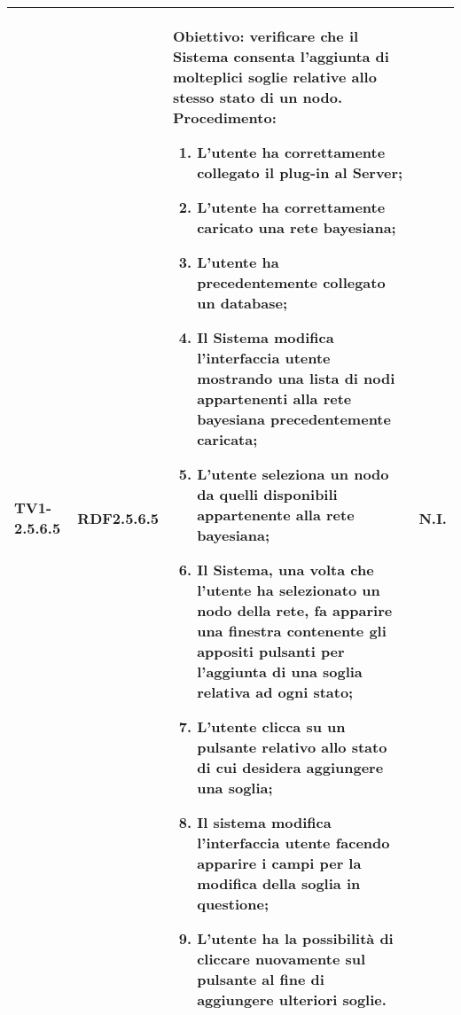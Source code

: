 \begin{longtable}{|C{.15\textwidth}|C{.13\textwidth}|m{.52\textwidth}|C{.08\textwidth}|}
TV1-2.5.6.5 & RDF2.5.6.5  &
	\textbf{Obiettivo}: verificare che il Sistema consenta l'aggiunta di molteplici soglie relative allo stesso stato di un nodo. \newline
	\textbf{Procedimento}:
	\begin{enumerate}
		\item L'utente ha correttamente collegato il plug-in al Server;
		\item L'utente ha correttamente caricato una rete bayesiana;
		\item L'utente ha precedentemente collegato un database;
		\item Il Sistema modifica l'interfaccia utente mostrando una lista di nodi appartenenti alla rete bayesiana precedentemente caricata;
		\item L'utente seleziona un nodo da quelli disponibili appartenente alla rete bayesiana;
		\item Il Sistema, una volta che l'utente ha selezionato un nodo della rete, fa apparire una finestra contenente gli appositi pulsanti per l'aggiunta di una soglia relativa ad ogni stato;
		\item L'utente clicca su un pulsante relativo allo stato di cui desidera aggiungere una soglia;
		\item Il sistema modifica l'interfaccia utente facendo apparire i campi per la modifica della soglia in questione;
		\item L'utente ha la possibilità di cliccare nuovamente sul pulsante al fine di aggiungere ulteriori soglie.
	\end{enumerate}
	& N.I. \\
\hline


\end{longtable}
